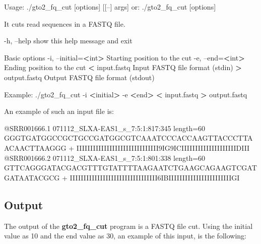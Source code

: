 \documentclass[11pt,]{krantz}
\newenvironment{Shaded}{\begin{snugshade}}{\end{snugshade}}
\newcommand{\OperatorTok}[1]{\textcolor[rgb]{0.43,0.43,0.43}{\textbf{#1}}}
\newcommand{\ExtensionTok}[1]{#1}
\newcommand{\NormalTok}[1]{#1}
\begin{document}
\begin{Shaded}
\begin{Highlighting}[]
\ExtensionTok{Usage}\NormalTok{: ./gto2_fq_cut [options] [[--] args]}
   \ExtensionTok{or}\NormalTok{: ./gto2_fq_cut [options]}

\ExtensionTok{It}\NormalTok{ cuts read sequences in a FASTQ file.}

    \ExtensionTok{-h}\NormalTok{, --help            show this help message and exit}

\ExtensionTok{Basic}\NormalTok{ options}
    \ExtensionTok{-i}\NormalTok{, --initial=}\OperatorTok{<}\NormalTok{int}\OperatorTok{>}\NormalTok{   Starting position to the cut}
    \ExtensionTok{-e}\NormalTok{, --end=}\OperatorTok{<}\NormalTok{int}\OperatorTok{>}\NormalTok{       Ending position to the cut}
    \OperatorTok{<} \ExtensionTok{input.fastq}\NormalTok{         Input FASTQ file format (stdin)}
    \OperatorTok{>} \ExtensionTok{output.fastq}\NormalTok{        Output FASTQ file format (stdout)}

\ExtensionTok{Example}\NormalTok{: ./gto2_fq_cut -i }\OperatorTok{<}\NormalTok{initial}\OperatorTok{>}\NormalTok{ -e }\OperatorTok{<}\NormalTok{end}\OperatorTok{>} \OperatorTok{<}\NormalTok{ input.fastq }
\OperatorTok{>} \ExtensionTok{output.fastq}
\end{Highlighting}
\end{Shaded}

An example of such an input file is:

\begin{Shaded}
\begin{Highlighting}[]
\ExtensionTok{@SRR001666.1}\NormalTok{ 071112_SLXA-EAS1_s_7:5:1:817:345 length=60}
\ExtensionTok{GGGTGATGGCCGCTGCCGATGGCGTCAAATCCCACCAAGTTACCCTTAACAACTTAAGGG}
\ExtensionTok{+}
\ExtensionTok{IIIIIIIIIIIIIIIIIIIIIIIIIIIIII9IG9ICIIIIIIIIIIIIIIIIIIIIDIII}
\ExtensionTok{@SRR001666.2}\NormalTok{ 071112_SLXA-EAS1_s_7:5:1:801:338 length=60}
\ExtensionTok{GTTCAGGGATACGACGTTTGTATTTTAAGAATCTGAAGCAGAAGTCGATGATAATACGCG}
\ExtensionTok{+}
\ExtensionTok{IIIIIIIIIIIIIIIIIIIIIIIIIIIIIIII6IBIIIIIIIIIIIIIIIIIIIIIIIGI}
\end{Highlighting}
\end{Shaded}

\subsection*{Output}\label{output-17}


The output of the \textbf{gto2\_fq\_cut} program is a FASTQ file cut.
Using the initial value as 10 and the end value as 30, an example of
this input, is the following:
\end{document}
